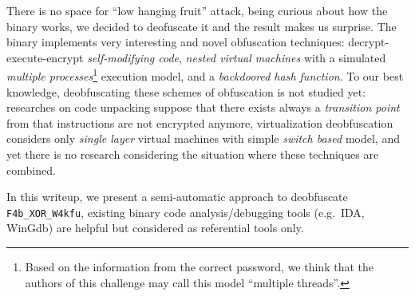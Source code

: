 \documentclass{easychair}
\begin{document}
There is no space for ``low hanging fruit'' attack, being curious about how the binary works, we decided to deofuscate it and the result makes us surprise. The binary implements very interesting and novel obfuscation techniques: decrypt-execute-encrypt \emph{self-modifying code}, \emph{nested virtual machines} with a simulated \emph{multiple processes}\footnote{Based on the information from the correct password, we think that the authors of this challenge may call this model ``multiple threads''.} execution model, and a \emph{backdoored hash function}. To our best knowledge, deobfuscating these schemes of obfuscation is not studied yet: researches on code unpacking suppose that there exists always a \emph{transition point} from that instructions are not encrypted anymore, virtualization deobfuscation considers only \emph{single layer} virtual machines with simple \emph{switch based} model, and yet there is no research considering the situation where these techniques are combined.

In this writeup, we present a semi-automatic approach to deobfuscate  \texttt{F4b\_XOR\_W4kfu}, existing binary code analysis/debugging tools (e.g.~IDA, WinGdb) are helpful but considered as referential tools only.
\end{document}
